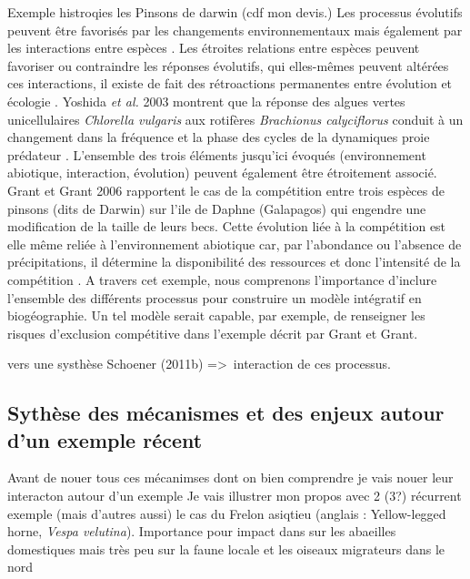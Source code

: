 Exemple histroqies les Pinsons de darwin (cdf mon devis.) Les processus
évolutifs peuvent être favorisés par les changements environnementaux
mais également par les interactions entre espèces \cite{Tingley2009}.
Les étroites relations entre espèces peuvent favoriser ou contraindre
les réponses évolutifs, qui elles-mêmes peuvent altérées ces
interactions, il existe de fait des rétroactions permanentes entre
évolution et écologie \cite{Post2009}. Yoshida \textit{et al.} 2003
montrent que la réponse des algues vertes unicellulaires
\textit{Chlorella vulgaris} aux rotifères
\textit{Brachionus calyciflorus} conduit à un changement dans la
fréquence et la phase des cycles de la dynamiques proie prédateur
\cite{Yoshida2003}. L'ensemble des trois éléments jusqu'ici évoqués
(environnement abiotique, interaction, évolution) peuvent également être
étroitement associé. Grant et Grant 2006 rapportent le cas de la
compétition entre trois espèces de pinsons (dits de Darwin) sur l'ile de
Daphne (Galapagos) qui engendre une modification de la taille de leurs
becs. Cette évolution liée à la compétition est elle même reliée à
l'environnement abiotique car, par l'abondance ou l'absence de
précipitations, il détermine la disponibilité des ressources et donc
l'intensité de la compétition \cite{Grant2006}. A travers cet exemple,
nous comprenons l'importance d'inclure l'ensemble des différents
processus pour construire un modèle intégratif en biogéographie. Un tel
modèle serait capable, par exemple, de renseigner les risques
d'exclusion compétitive dans l'exemple décrit par Grant et Grant.

vers une systhèse Schoener (2011b) =\textgreater{}~interaction de ces
processus.

\subsection*{Sythèse des mécanismes et des enjeux autour d'un exemple
récent}\label{sythuxe8se-des-muxe9canismes-et-des-enjeux-autour-dun-exemple-ruxe9cent}

Avant de nouer tous ces mécanimses dont on bien comprendre je vais nouer
leur interacton autour d'un exemple Je vais illustrer mon propos avec 2
(3?) récurrent exemple (mais d'autres aussi) le cas du Frelon asiqtieu
(anglais : Yellow-legged horne, \emph{Vespa velutina}). Importance pour
impact dans sur les abaeilles domestiques mais très peu sur la faune
locale et les oiseaux migrateurs dans le nord

